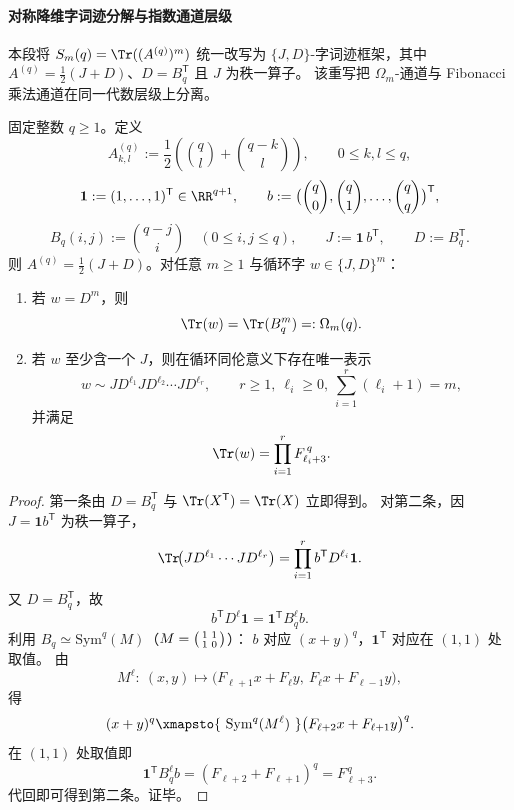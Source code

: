\paragraph{对称降维字词迹分解与指数通道层级}
本段将 \(S_m(q)=\Tr((A^{(q)})^m)\) 统一改写为 \(\{J,D\}\)-字词迹框架，其中
\(A^{(q)}=\frac12(J+D)\)、\(D=B_q^{\mathsf T}\) 且 \(J\) 为秩一算子。
该重写把 \(\Omega_m\)-通道与 Fibonacci 乘法通道在同一代数层级上分离。

\begin{conclusion}\label{con:xi-terminal-replica-softcore-trace-free-semigroup-lift}
固定整数 \(q\ge 1\)。定义
\[
A^{(q)}_{k,l}:=\frac12\!\left(\binom{q}{l}+\binom{q-k}{l}\right),\qquad 0\le k,l\le q,
\]
\[
\mathbf 1:=(1,\dots,1)^{\mathsf T}\in\RR^{q+1},\qquad
b:=\bigl(\binom{q}{0},\binom{q}{1},\dots,\binom{q}{q}\bigr)^{\mathsf T},
\]
\[
B_q(i,j):=\binom{q-j}{i}\quad(0\le i,j\le q),\qquad
J:=\mathbf 1\,b^{\mathsf T},\qquad
D:=B_q^{\mathsf T}.
\]
则 \(A^{(q)}=\frac12(J+D)\)。对任意 \(m\ge 1\) 与循环字 \(w\in\{J,D\}^m\)：
\begin{enumerate}
  \item 若 \(w=D^m\)，则
  \[
  \Tr(w)=\Tr(B_q^m)=:\Omega_m(q).
  \]
  \item 若 \(w\) 至少含一个 \(J\)，则在循环同伦意义下存在唯一表示
  \[
  w\sim J D^{\ell_1}J D^{\ell_2}\cdots J D^{\ell_r},
  \qquad
  r\ge 1,\ \ell_i\ge 0,\ \sum_{i=1}^r(\ell_i+1)=m,
  \]
  并满足
  \[
  \Tr(w)=\prod_{i=1}^{r}F_{\ell_i+3}^{\,q}.
  \]
\end{enumerate}
\end{conclusion}
\begin{proof}
第一条由 \(D=B_q^{\mathsf T}\) 与 \(\Tr(X^{\mathsf T})=\Tr(X)\) 立即得到。
对第二条，因 \(J=\mathbf 1b^{\mathsf T}\) 为秩一算子，
\[
\Tr\!\bigl(JD^{\ell_1}\cdots JD^{\ell_r}\bigr)=\prod_{i=1}^{r}b^{\mathsf T}D^{\ell_i}\mathbf 1.
\]
又 \(D=B_q^{\mathsf T}\)，故
\[
b^{\mathsf T}D^\ell\mathbf 1=\mathbf 1^{\mathsf T}B_q^\ell b.
\]
利用 \(B_q\simeq\mathrm{Sym}^q(M)\)（\(M=\begin{psmallmatrix}1&1\\[1pt]1&0\end{psmallmatrix}\)）：
\(b\) 对应 \((x+y)^q\)，\(\mathbf 1^{\mathsf T}\) 对应在 \((1,1)\) 处取值。
由
\[
M^\ell:\ (x,y)\longmapsto\bigl(F_{\ell+1}x+F_\ell y,\ F_\ell x+F_{\ell-1}y\bigr),
\]
得
\[
(x+y)^q\xmapsto{\ \mathrm{Sym}^q(M^\ell)\ }\bigl(F_{\ell+2}x+F_{\ell+1}y\bigr)^q.
\]
在 \((1,1)\) 处取值即
\[
\mathbf 1^{\mathsf T}B_q^\ell b=(F_{\ell+2}+F_{\ell+1})^q=F_{\ell+3}^{\,q}.
\]
代回即可得到第二条。证毕。
\end{proof}

